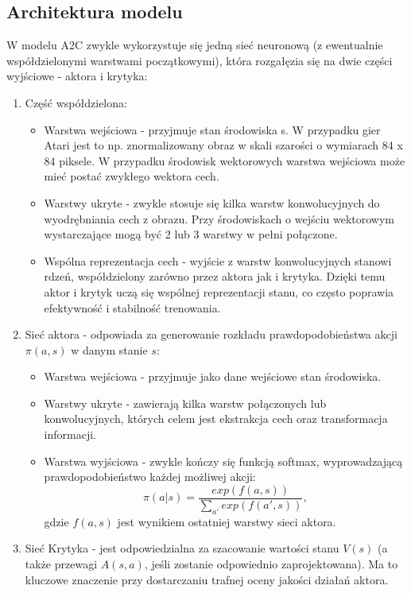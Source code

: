 \documentclass[a4paper, 12pt]{article}
\numberwithin{equation}{section}
\begin{document}
    \subsection{Architektura modelu}
    W modelu A2C zwykle wykorzystuje się jedną sieć neuronową (z ewentualnie współdzielonymi warstwami początkowymi), która rozgałęzia się na dwie części wyjściowe - aktora i krytyka:
    \begin{enumerate}
        \item Część współdzielona:
        \begin{itemize}
            \item Warstwa wejściowa - przyjmuje stan środowiska s. W przypadku gier Atari jest to np. znormalizowany obraz w skali szarości o wymiarach 84 x 84 piksele. W przypadku środowisk wektorowych warstwa wejściowa może mieć postać zwykłego wektora cech.
            \item Warstwy ukryte - zwykle stosuje się kilka warstw konwolucyjnych do wyodrębniania cech z obrazu. Przy środowiskach o wejściu wektorowym wystarczające mogą być 2 lub 3 warstwy w pełni połączone.
            \item Wspólna reprezentacja cech - wyjście z warstw konwolucyjnych stanowi rdzeń, współdzielony zarówno przez aktora jak i krytyka. Dzięki temu aktor i krytyk uczą się wspólnej reprezentacji stanu, co często poprawia efektywność i stabilność trenowania.
        \end{itemize}
        \item Sieć aktora - odpowiada za generowanie rozkładu prawdopodobieństwa akcji \( \pi(a,s) \) w danym stanie \( s \):
        \begin{itemize}
            \item Warstwa wejściowa - przyjmuje jako dane wejściowe stan środowiska.
            \item Warstwy ukryte - zawierają kilka warstw połączonych lub konwolucyjnych, których celem jest ekstrakcja cech oraz transformacja informacji.
            \item Warstwa wyjściowa - zwykle kończy się funkcją softmax, wyprowadzającą prawdopodobieństwo każdej możliwej akcji:
            \begin{equation}
            \pi(a|s) = \frac{exp(f(a,s))}{\sum_{a'}exp(f(a',s))},
            \end{equation}
            gdzie \( f(a,s) \) jest wynikiem ostatniej warstwy sieci aktora.
        \end{itemize}
        \item Sieć Krytyka - jest odpowiedzialna za szacowanie wartości stanu \( V(s) \) (a także przewagi \( A(s,a) \), jeśli zostanie odpowiednio zaprojektowana). Ma to kluczowe znaczenie przy dostarczaniu trafnej oceny jakości działań aktora.

\end{enumerate}
\end{document}
